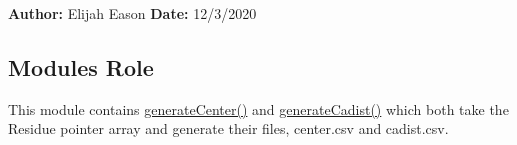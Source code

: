{\bfseries Author\+:} Elijah Eason {\bfseries Date\+:} 12/3/2020 \subsection*{Module\textquotesingle{}s Role}

This module contains \hyperlink{util_8c_a749f7c5e72d7b088403b739af84f080d}{generate\+Center()} and \hyperlink{util_8c_a8377fb7e5b8b960df60dbaf86e736e6c}{generate\+Cadist()} which both take the Residue pointer array and generate their files, center.\+csv and cadist.\+csv. 